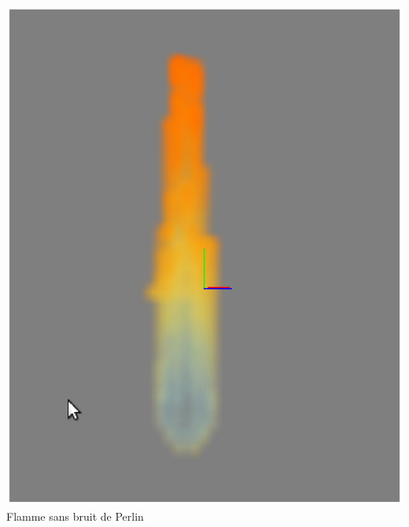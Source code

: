 \documentclass[a4paper,10pt]{article}
\begin{document}
\begin{center}
\includegraphics[scale=0.5]{SansPerlin.ps}\\
Flamme sans bruit de Perlin
\end{center}
\end{document}
